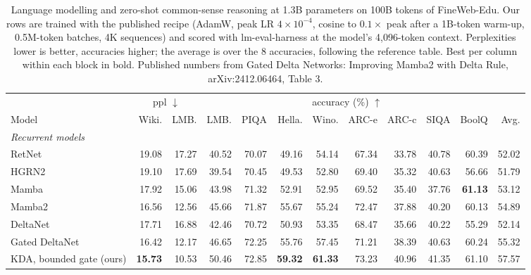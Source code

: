 % 
\begin{table}[t]
  \centering
  \footnotesize
  \setlength{\tabcolsep}{3.5pt}
  \caption{Language modelling and zero-shot common-sense reasoning at 1.3B parameters on 100B tokens of FineWeb-Edu. Our rows are trained with the published recipe (AdamW, peak LR $4\times10^{-4}$, cosine to $0.1\times$ peak after a 1B-token warm-up, 0.5M-token batches, 4K sequences) and scored with lm-eval-harness at the model's 4{,}096-token context. Perplexities lower is better, accuracies higher; the average is over the 8 accuracies, following the reference table. Best per column within each block in bold. Published numbers from Gated Delta Networks: Improving Mamba2 with Delta Rule, arXiv:2412.06464, Table 3.}
  \label{tab:fwedu-1p3b-gdn}
  \begin{tabular}{lrrrrrrrrrrr}
    \toprule
    & \multicolumn{2}{c}{ppl $\downarrow$} & \multicolumn{8}{c}{accuracy (\%) $\uparrow$} & \\
    \cmidrule(lr){2-3} \cmidrule(lr){4-11} \cmidrule(lr){12-12}
    Model & Wiki. & LMB. & LMB. & PIQA & Hella. & Wino. & ARC-e & ARC-c & SIQA & BoolQ & Avg. \\
    \midrule
    \multicolumn{12}{l}{\textit{Recurrent models}} \\
    RetNet & 19.08 & 17.27 & 40.52 & 70.07 & 49.16 & 54.14 & 67.34 & 33.78 & 40.78 & 60.39 & 52.02 \\
    HGRN2 & 19.10 & 17.69 & 39.54 & 70.45 & 49.53 & 52.80 & 69.40 & 35.32 & 40.63 & 56.66 & 51.79 \\
    Mamba & 17.92 & 15.06 & 43.98 & 71.32 & 52.91 & 52.95 & 69.52 & 35.40 & 37.76 & \textbf{61.13} & 53.12 \\
    Mamba2 & 16.56 & 12.56 & 45.66 & 71.87 & 55.67 & 55.24 & 72.47 & 37.88 & 40.20 & 60.13 & 54.89 \\
    DeltaNet & 17.71 & 16.88 & 42.46 & 70.72 & 50.93 & 53.35 & 68.47 & 35.66 & 40.22 & 55.29 & 52.14 \\
    Gated DeltaNet & 16.42 & 12.17 & 46.65 & 72.25 & 55.76 & 57.45 & 71.21 & 38.39 & 40.63 & 60.24 & 55.32 \\
    KDA, bounded gate (ours) & \textbf{15.73} & 10.53 & 50.46 & 72.85 & \textbf{59.32} & \textbf{61.33} & 73.23 & 40.96 & 41.35 & 61.10 & 57.57 \\

\end{tabular}
\end{table}
